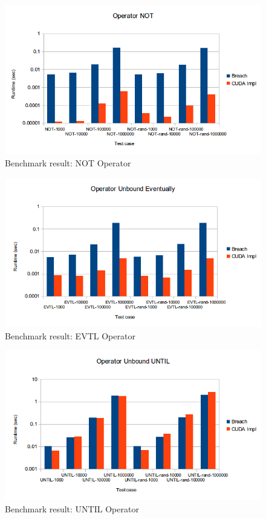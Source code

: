\documentclass[a4paper,10pt]{article}
\begin{document}
\begin{figure}[H]
    \includegraphics[scale=0.5]{bm_not.png}
    \caption{
        \label{fig:bm_not}
        Benchmark result: NOT Operator}
\end{figure}

\begin{figure}[H]
    \includegraphics[scale=0.5]{bm_evtl.png}
    \caption{
        \label{fig:bm_evtl}
        Benchmark result: EVTL Operator}
\end{figure}

\begin{figure}[H]
    \includegraphics[scale=0.5]{bm_until.png}
    \caption{
        \label{fig:bm_until}
        Benchmark result: UNTIL Operator}
\end{figure}
\end{document}
